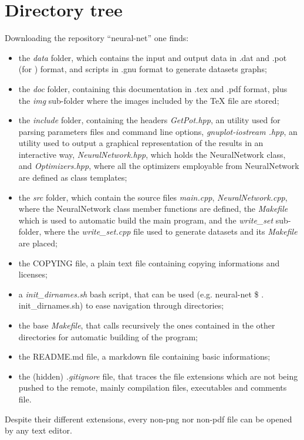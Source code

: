 \documentclass[12pt, a4paper]{report}
\theoremstyle{definition}
\begin{document}
\section{Directory tree}
Downloading the repository ``neural-net'' one finds:
\begin{itemize}
	\item the \textit{data} folder, which contains the input and output data in .dat and .pot (for \cite{getpot}) format, and \cite{gnuplot} scripts in .gnu format to generate datasets graphs;
	\item the \textit{doc} folder, containing this documentation in .tex and .pdf format, plus the \textit{img} sub-folder where the images included by the TeX file are stored;
	\item the \textit{include} folder, containing the headers \textit{GetPot.hpp}, an utility used for parsing parameters files and command line options, \textit{gnuplot-iostream .hpp}, an utility used to output a graphical representation of the results in an interactive way, \textit{NeuralNetwork.hpp}, which holds the NeuralNetwork class, and \textit{Optimizers.hpp}, where all the optimizers employable from NeuralNetwork are defined as class templates;
	\item the \textit{src} folder, which contain the source files \textit{main.cpp}, \textit{NeuralNetwork.cpp}, where the NeuralNetwork class member functions are defined, the \textit{Makefile} which is used to automatic build the main program, and the \textit{write\_set} sub-folder, where the \textit{write\_set.cpp} file used to generate datasets and its \textit{Makefile} are placed;
	\item the COPYING file, a plain text file containing copying informations and licenses;
	\item a \textit{init\_dirnames.sh} bash script, that can be used (e.g. {\ttfamily neural-net \$ . init\_dirnames.sh}) to ease navigation through directories;
	\item the base \textit{Makefile}, that calls recursively the ones contained in the other directories for automatic building of the program;
	\item the README.md file, a markdown file containing basic informations;
	\item the (hidden) \textit{.gitignore} file, that traces the file extensions which are not being pushed to the remote, mainly compilation files, executables and comments file.
\end{itemize}
\noindent Despite their different extensions, every non-png nor non-pdf file can be opened by any text editor.
\end{document}
